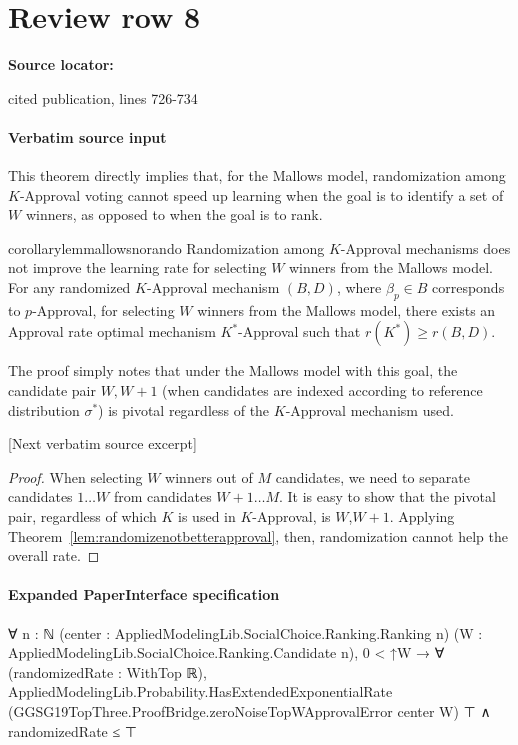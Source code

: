 \documentclass[10pt]{article}
\begin{document}
\section*{Review row 8}
\textbf{Source locator:} {\footnotesize\raggedright cited publication, lines 726-\allowbreak{}734\par}
\paragraph{Verbatim source input}
\begin{ReviewVerbatim}
This theorem directly implies that, for the Mallows model, randomization among $K$-Approval voting cannot speed up learning when the goal is to identify a set of $W$ winners, as opposed to when the goal is to rank.

\begin{restatable}{corollary}{lemmallowsnorando}
	\label{lem:mallowsnorando}
			Randomization among $K$-Approval mechanisms does not improve the learning rate for selecting $W$ winners from the Mallows model. For any randomized $K$-Approval mechanism $(B,D)$, where $\beta_p\in B$ corresponds to $p$-Approval, for selecting $W$ winners from the Mallows model, there exists an Approval rate optimal mechanism $K^*$-Approval such that $r(K^*) \geq r(B,D)$.

\end{restatable}

The proof simply notes that under the Mallows model with this goal, the candidate pair $W, W+1$ (when candidates are indexed according to reference distribution $\sigma^*$) is pivotal regardless of the $K$-Approval mechanism used.

[Next verbatim source excerpt]

\lemmallowsnorando*
\begin{proof}
	When selecting $W$ winners out of $M$ candidates, we need to separate candidates $1 \dots W$ from candidates $W + 1 \dots M$. It is easy to show that the pivotal pair, regardless of which $K$ is used in $K$-Approval, is $W$,$W+1$. Applying Theorem~\ref{lem:randomizenotbetterapproval}, then, randomization cannot help the overall rate.
\end{proof}
\end{ReviewVerbatim}



\paragraph{Expanded PaperInterface specification}
\begin{ReviewVerbatim}
∀ {n : ℕ} (center : AppliedModelingLib.SocialChoice.Ranking.Ranking n)
  (W : AppliedModelingLib.SocialChoice.Ranking.Candidate n),
  0 < ↑W →
    ∀ (randomizedRate : WithTop ℝ),
      AppliedModelingLib.Probability.HasExtendedExponentialRate
          (GGSG19TopThree.ProofBridge.zeroNoiseTopWApprovalError center W) ⊤ ∧
        randomizedRate ≤ ⊤
\end{ReviewVerbatim}
\end{document}
